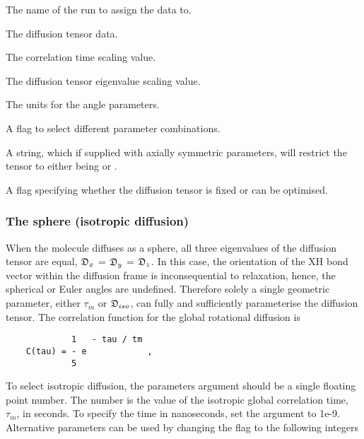   The name of the run to assign the data to. 

  The diffusion tensor data. 

  The correlation time scaling value. 

  The diffusion tensor eigenvalue scaling value. 

  The units for the angle parameters. 

  A flag to select different parameter combinations. 

  A string, which if supplied with axially symmetric parameters, will restrict the tensor to either being  or . 

  A flag specifying whether the diffusion tensor is fixed or can be optimised. 




\subsubsection{The sphere (isotropic diffusion)}

When the molecule diffuses as a sphere, all three eigenvalues of the diffusion tensor are equal, $\mathfrak{D}_x$ = $\mathfrak{D}_y$ = $\mathfrak{D}_z$.  In this case, the orientation of the XH bond vector within the diffusion frame is inconsequential to relaxation, hence, the spherical or Euler angles are undefined.  Therefore solely a single geometric parameter, either $\tau_m$ or $\mathfrak{D}_{iso}$, can fully and sufficiently parameterise the diffusion tensor.  The correlation function for the global rotational diffusion is


{\footnotesize \begin{verbatim}
             1   - tau / tm
    C(tau) = - e            ,
             5
\end{verbatim}}

To select isotropic diffusion, the parameters argument should be a single floating point number.  The number is the value of the isotropic global correlation time, $\tau_m$, in seconds. To specify the time in nanoseconds, set the  argument to 1e-9.  Alternative parameters can be used by changing the  flag to the following integers


